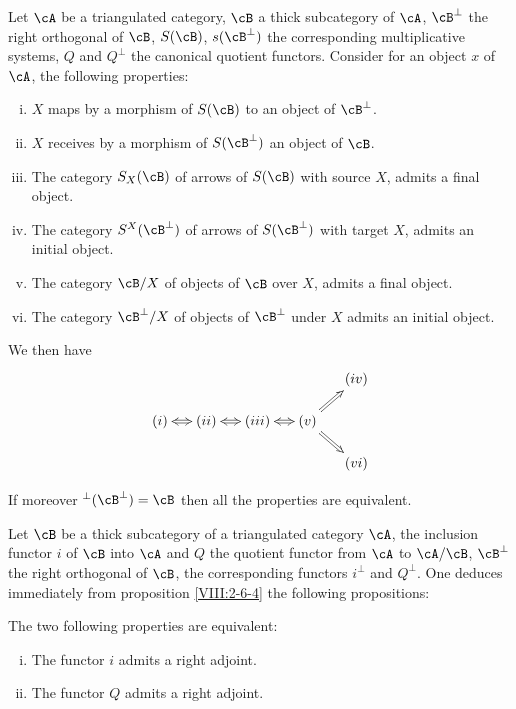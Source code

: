 \begin{proposition}\label{VIII:2-6-4}
Let $\cA$ be a triangulated category, $\cB$ a thick
subcategory of $\cA$, $\cB^\bot$ the right orthogonal of $\cB$, $S(\cB)$,
$s(\cB^\bot)$ the corresponding multiplicative systems, $Q$ and $Q^\bot$ the
canonical quotient functors. Consider for an object $x$ of
$\cA$, the following properties:
\begin{enumerate}[(i)]
  \item $X$ maps by a morphism of $S(\cB)$ to an object of $\cB^\bot$.
  \item $X$ receives by a morphism of $S(\cB^\bot)$ an object of $\cB$.
  \item The category $S_X(\cB)$ of arrows of $S(\cB)$ with source $X$,
    admits a final object.
  \item The category $S^X(\cB^\bot)$ of arrows of $S(\cB^\bot)$ with target
    $X$, admits an initial object.
  \item The category $\cB/X$ of objects of $\cB$ over $X$, admits a
    final object.
  \item The category $\cB^\bot/X$ of objects of $\cB^\bot$ under $X$
    admits an initial object.
\end{enumerate}
We then have 
\[\xymatrix@=0.5cm{
  & & & & (iv) \\
  (i) \ar@{<=>}[r] 
    & (ii) \ar@{<=>}[r] 
    & (iii) \ar@{<=>}[r] 
    & (v) \ar@{=>}[ur] \ar@{=>}[dr] \\
  & & & & (vi) 
}\]

If moreover $^\bot(\cB^\bot)=\cB$ then all the properties are
equivalent.
\end{proposition}

Let $\cB$ be a thick subcategory of a triangulated category
$\cA$, the inclusion functor $i$ of $\cB$ into $\cA$ and $Q$ the
quotient functor from $\cA$ to $\cA/\cB$, $\cB^\bot$ the right
orthogonal of $\cB$, the corresponding functors $i^\bot$ and $Q^\bot$. One deduces
immediately from proposition \ref{VIII:2-6-4} the following propositions: 





\begin{proposition}\label{VIII:2-6-5}
The two following properties are equivalent:
\begin{enumerate}[(i)]
  \item The functor $i$ admits a right adjoint.
  \item The functor $Q$ admits a right adjoint.
\end{enumerate}
\end{proposition}

